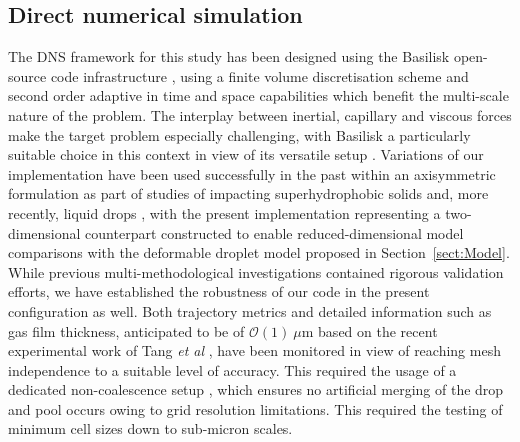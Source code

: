 \subsection{Direct numerical simulation}
The DNS framework for this study has been designed using the Basilisk open-source code infrastructure \cite{popinet2009accurate,popinet2015quadtree}, using a finite volume discretisation scheme and second order adaptive in time and space capabilities which benefit the multi-scale nature of the problem. The interplay between inertial, capillary and viscous forces make the target problem especially challenging, with Basilisk a particularly suitable choice in this context in view of its versatile setup \cite{popinet2018numerical}. Variations of our implementation have been used successfully in the past within an axisymmetric formulation as part of studies of impacting superhydrophobic solids \cite{galeano2021capillary} and, more recently, liquid drops \cite{alventosa2023inertio}, with the present implementation representing a two-dimensional counterpart constructed to enable reduced-dimensional model comparisons with the deformable droplet model proposed in Section~\ref{sect:Model}. While previous multi-methodological investigations contained rigorous validation efforts, we have established the robustness of our code in the present configuration as well. Both trajectory metrics and detailed information such as gas film thickness, anticipated to be of $\mathcal{O}(1)\ \mu$m based on the recent experimental work of Tang \textit{et al} \cite{tang2019bouncing}, have been monitored in view of reaching mesh independence to a suitable level of accuracy. This required the usage of a dedicated non-coalescence setup \cite{sanjay2023drop}, which ensures no artificial merging of the drop and pool occurs owing to grid resolution limitations. This required the testing of minimum cell sizes down to sub-micron scales.

